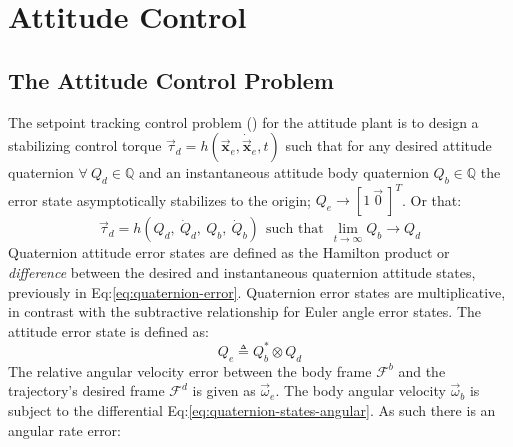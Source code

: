 \section{Attitude Control}
\label{sec:control.attitude}
\subsection{The Attitude Control Problem}
\label{subsec:control.attitude.problem}
The setpoint tracking control problem (\cite{attitudecontrolproblem}) for the attitude plant is to design a stabilizing control torque $\vec{\tau}_d=h(\vec{\mathbf{x}}_e,\dot{\vec{\mathbf{x}}}_e,t)$ such that for any desired attitude quaternion $\forall~Q_d\in\mathbb{Q}$ and an instantaneous attitude body quaternion $Q_b\in\mathbb{Q}$ the error state asymptotically stabilizes to the origin; $Q_e\rightarrow[1~\vec{0}~]^T$. Or that:
\begin{equation}
\vec{\tau}_d=h(Q_d,~\dot{Q}_d,~Q_b,~\dot{Q}_b)~~\text{such that}~~\underset{t\rightarrow\infty}{\lim}Q_b\rightarrow Q_d
\end{equation}
Quaternion attitude error states are defined as the Hamilton product or \emph{difference} between the desired and instantaneous quaternion attitude states, previously in Eq:\ref{eq:quaternion-error}. Quaternion error states are multiplicative, in contrast with the subtractive relationship for Euler angle error states. The attitude error state is defined as:
\begin{equation}\label{eq:quaternion-error-control}
Q_e\triangleq Q_b^*\otimes Q_d
\end{equation}
The relative angular velocity error between the body frame $\mathcal{F}^b$ and the trajectory's desired frame $\mathcal{F}^d$ is given as $\vec{\omega}_e$. The body angular velocity $\vec{\omega}_b$ is subject to the differential Eq:\ref{eq:quaternion-states-angular}. As such there is an angular rate error:

